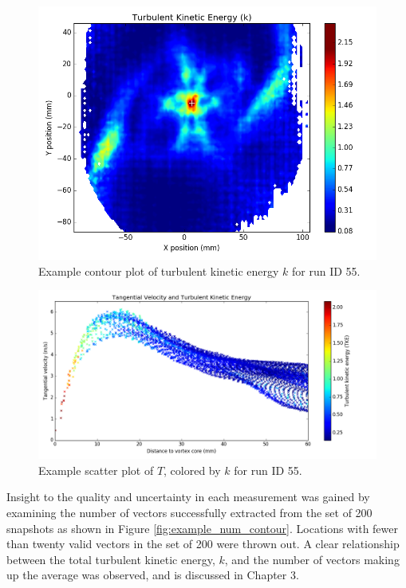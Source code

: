 {\begin{figure}[H]
	\centering
	\includegraphics[width=5in]{figs/example_vortex_figs/example_ctke_contour}
\caption{Example contour plot of turbulent kinetic energy $k$ for run ID 55.}
\label{fig:examp_tke}
\end{figure}

\begin{figure}[H]
	\centering
	\includegraphics[width=7in]{figs/example_vortex_figs/example_TscatterTKE}
\caption{Example scatter plot of $T$, colored by $k$ for run ID 55.}
\label{fig:examp_Tscatter}
\end{figure}

Insight to the quality and uncertainty in each measurement was gained by 
examining the number of vectors successfully extracted from the set of 200 
snapshots as shown in Figure \ref{fig:example_num_contour}. Locations with 
fewer than twenty valid vectors in the set of 200 were thrown out. A clear 
relationship between the total turbulent kinetic energy, $k$, and the number of 
vectors making up the average was observed, and is discussed in Chapter 3.

}
